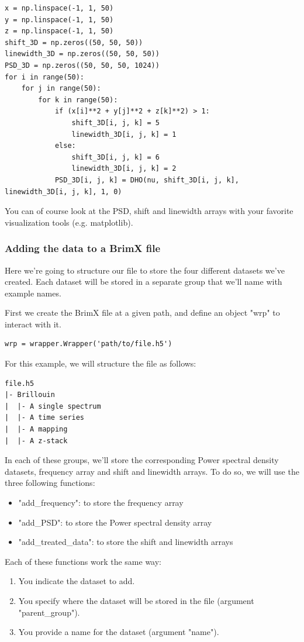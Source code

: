 \documentclass{article}
\begin{document}
\begin{itemize}
\begin{lstlisting}
x = np.linspace(-1, 1, 50)
y = np.linspace(-1, 1, 50)
z = np.linspace(-1, 1, 50)
shift_3D = np.zeros((50, 50, 50))
linewidth_3D = np.zeros((50, 50, 50))
PSD_3D = np.zeros((50, 50, 50, 1024))
for i in range(50):
    for j in range(50):
        for k in range(50):
            if (x[i]**2 + y[j]**2 + z[k]**2) > 1:
                shift_3D[i, j, k] = 5 
                linewidth_3D[i, j, k] = 1 
            else:
                shift_3D[i, j, k] = 6 
                linewidth_3D[i, j, k] = 2 
            PSD_3D[i, j, k] = DHO(nu, shift_3D[i, j, k], linewidth_3D[i, j, k], 1, 0)
\end{lstlisting}
\end{itemize}

You can of course look at the PSD, shift and linewidth arrays with your favorite visualization tools (e.g. matplotlib).

\subsubsection{Adding the data to a BrimX file}

Here we're going to structure our file to store the four different datasets we've created. Each dataset will be stored in a separate group that we'll name with example names.

First we create the BrimX file at a given path, and define an object "wrp" to interact with it.
\begin{lstlisting}
wrp = wrapper.Wrapper('path/to/file.h5')
\end{lstlisting}

For this example, we will structure the file as follows:
\begin{verbatim}
file.h5
|- Brillouin
|  |- A single spectrum 
|  |- A time series
|  |- A mapping
|  |- A z-stack
\end{verbatim}

In each of these groups, we'll store the corresponding Power spectral density datasets, frequency array and shift and linewidth arrays. To do so, we will use the three following functions:
\begin{itemize}
    \item "add\_frequency": to store the frequency array
    \item "add\_PSD": to store the Power spectral density array
    \item "add\_treated\_data": to store the shift and linewidth arrays
\end{itemize}
Each of these functions work the same way:
\begin{enumerate}
    \item You indicate the dataset to add.
    \item You specify where the dataset will be stored in the file (argument "parent\_group").
    \item You provide a name for the dataset (argument "name").
\end{enumerate}
\end{document}
